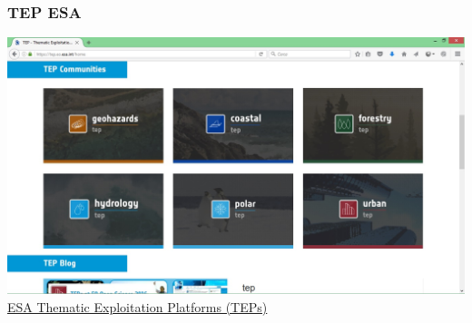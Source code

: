 \begin{frame}
  \frametitle{ TEP ESA }
 \includegraphics[width=1\textwidth]{images/esa_tep.jpg}\\
  
\href{https://tep.eo.esa.int/}{ESA Thematic Exploitation Platforms (TEPs)} 
 
\end{frame}

